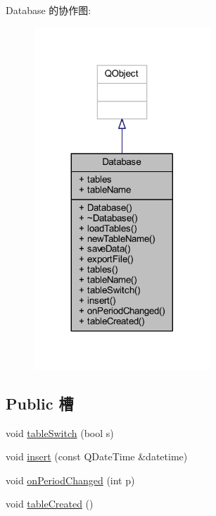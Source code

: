 Database 的协作图\+:
\nopagebreak
\begin{figure}[H]
\begin{center}
\leavevmode
\includegraphics[width=188pt]{class_database__coll__graph}
\end{center}
\end{figure}
\subsection*{Public 槽}
\begin{DoxyCompactItemize}
\item 
void \hyperlink{class_database_a5cafa53304f3ff79a2487f5333cab8ad}{table\+Switch} (bool s)
\item 
void \hyperlink{class_database_a2262e223186a88b1ac0f88245bfaab71}{insert} (const Q\+Date\+Time \&datetime)
\item 
void \hyperlink{class_database_a857e6024cbfab56a3f3521ccc6769cf4}{on\+Period\+Changed} (int p)
\item 
void \hyperlink{class_database_af6cffa238311bf9d398f401c314160bf}{table\+Created} ()
\end{DoxyCompactItemize}
